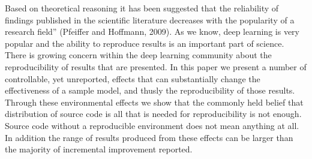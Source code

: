 Based on theoretical reasoning it has been suggested that the reliability of findings published in the scientific literature decreases with the popularity of a research field'' (Pfeiffer and Hoffmann, 2009). As we know, deep learning is very popular and the ability to reproduce results is an important part of science. There is growing concern within the deep learning community about the reproducibility of results that are presented.  In this paper we present a number of controllable, yet unreported, effects that can substantially change the effectiveness of a sample model, and thusly the reproducibility of those results. Through these environmental effects we show that the commonly held belief that distribution of source code is all that is needed for reproducibility is not enough. Source code without a reproducible environment does not mean anything at all. In addition the range of results produced from these effects can be larger than the majority of incremental improvement reported.
